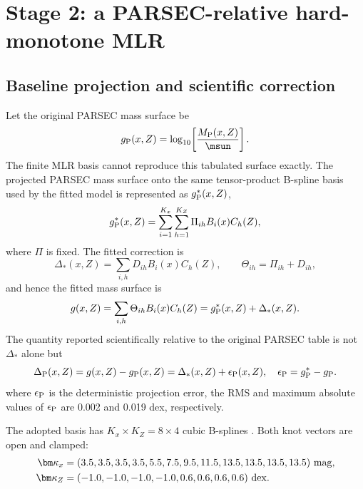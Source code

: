 \section{Stage 2: a PARSEC-relative hard-monotone MLR}
\label{sec:mlr}

\subsection{Baseline projection and scientific correction}

Let the original PARSEC mass surface be
\begin{equation}
 g_{\rm P}(x,Z)=\log_{10}\!\left[\frac{M_{\rm P}(x,Z)}{\msun}\right].
\end{equation}
The finite MLR basis cannot reproduce this tabulated surface exactly.  The projected PARSEC mass surface onto the same tensor-product B-spline basis used by the fitted model is represented as $g_{\rm P}^{*}(x,Z)$, 
\begin{equation}
 g_{\rm P}^{*}(x,Z)=\sum_{i=1}^{K_x}\sum_{h=1}^{K_Z}
 \Pi_{ih}B_i(x)C_h(Z),
\end{equation}
where $\Pi$ is fixed.  The fitted correction is
\begin{equation}
 \Delta_*(x,Z)=\sum_{i,h}D_{ih}B_i(x)C_h(Z),
 \qquad \Theta_{ih}=\Pi_{ih}+D_{ih},
\end{equation}
and hence the fitted mass surface is
\begin{equation}
 g(x,Z)=\sum_{i,h}\Theta_{ih}B_i(x)C_h(Z)
       =g_{\rm P}^{*}(x,Z)+\Delta_*(x,Z).
 \label{eq:g-total}
\end{equation}
The quantity reported scientifically relative to the original PARSEC table is
not $\Delta_*$ alone but
\begin{equation}
 \Delta_{\rm P}(x,Z)=g(x,Z)-g_{\rm P}(x,Z)
 =\Delta_*(x,Z)+\epsilon_{\rm P}(x,Z),
 \quad \epsilon_{\rm P}=g_{\rm P}^{*}-g_{\rm P}.
 \label{eq:delta-parsec}
\end{equation}
where $\epsilon_{\rm P}$ is the deterministic projection error, the RMS and maximum absolute values of
$\epsilon_{\rm P}$ are 0.002 and 0.019 dex, respectively.

The adopted basis has $K_x\times K_Z=8\times4$ cubic B-splines
\citep{deBoor2001Splines}.  Both knot vectors are open and clamped:
\begin{align}
 \bm\kappa_x={}&(3.5,3.5,3.5,3.5,5.5,7.5,9.5,11.5,
                  13.5,13.5,13.5,13.5)\ {\rm mag},\\
 \bm\kappa_Z={}&(-1.0,-1.0,-1.0,-1.0,0.6,0.6,0.6,0.6)\ {\rm dex}.
\end{align}

